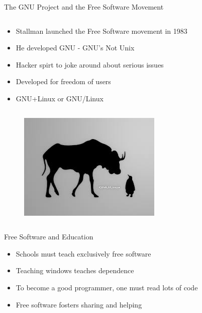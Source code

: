 \begin{frame}{The GNU Project and the Free Software Movement}
  \begin{column}{.45\textwidth}
    \begin{itemize}
      \item Stallman launched the Free Software movement in 1983
      \item He developed GNU - GNU's Not Unix
      \item Hacker spirt to joke around about serious issues
      \item Developed for freedom of users
      \item GNU+Linux or GNU/Linux
    \end{itemize}
  \end{column}
  \begin{column}{0.5\textwidth}\raggedleft{}
    \begin{figure}
      \includegraphics[width=\textwidth]{images/gnu-linux.jpg}
    \end{figure}
  \end{column}
\end{frame}


\begin{frame}{Free Software and Education}
  \begin{itemize}
    \item Schools must teach exclusively free software
    \item Teaching windows teaches dependence
    \item To become a good programmer, one must read lots of code
    \item Free software fosters sharing and helping
  \end{itemize}
\end{frame}


